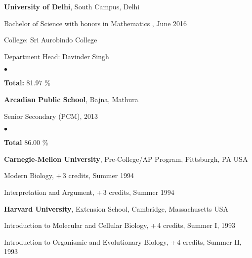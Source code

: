\documentclass[margin,line]{res}
\newenvironment{list1}{
  \begin{list}{\ding{113}}{%
      \setlength{\itemsep}{0in}
      \setlength{\parsep}{0in} \setlength{\parskip}{0in}
      \setlength{\topsep}{0in} \setlength{\partopsep}{0in} 
      \setlength{\leftmargin}{0.17in}}}{\end{list}}
\newenvironment{list2}{
  \begin{list}{$\bullet$}{%
      \setlength{\itemsep}{0in}
      \setlength{\parsep}{0in} \setlength{\parskip}{0in}
      \setlength{\topsep}{0in} \setlength{\partopsep}{0in} 
      \setlength{\leftmargin}{0.2in}}}{\end{list}}
\begin{document}
\begin{resume}
{\bf University of Delhi}, South Campus, Delhi\\
\vspace*{-.1in}
\begin{list1}
\item[] Bachelor of Science with honors in Mathematics , June 2016
\vspace*{.05in}
\item[] College:  Sri Aurobindo College
\item[] Department Head:  Davinder Singh
\begin{list2}
\item[] {\bf \footnotesize Total:} 81.97 \%
\end{list2}
\end{list1}

{\bf Arcadian Public School}, Bajna, Mathura\\
\vspace*{-.1in}
\begin{list1}
\item[] Senior Secondary (PCM),  2013
\begin{list2}
\item[] {\bf \footnotesize Total} 86.00 \%
\end{list2}
\end{list1}

{\bf Carnegie-Mellon University}, Pre-College/AP Program, Pittsburgh, PA USA\\
\vspace*{-.1in}
\begin{list1}
\item[] Modern Biology, +\,3 credits, Summer 1994
\item[] Interpretation and Argument, +\,3 credits, Summer 1994
\end{list1}

{\bf Harvard University}, Extension School, Cambridge, Massachusetts USA\\
\vspace*{-.1in}
\begin{list1}
\item[] Introduction to Molecular and Cellular Biology, +\,4 credits, Summer I, 1993
\item[] Introduction to Organismic and Evolutionary Biology, +\,4 credits, Summer II, 1993
\end{list1}


\end{resume}
\end{document}
